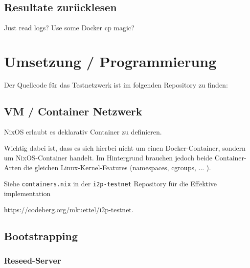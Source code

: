 \subsection{Resultate zurücklesen}

Just read logs? Use some Docker cp magic?

\section{Umsetzung / Programmierung}

Der Quellcode für das Testnetzwerk ist im folgenden Repository zu finden:

\subsection{VM / Container Netzwerk}

NixOS erlaubt es deklarativ Container zu definieren.

%

Wichtig dabei ist, dass es sich hierbei nicht um einen Docker-Container, sondern um NixOS-Container handelt.
Im Hintergrund brauchen jedoch beide Container-Arten die gleichen Linux-Kernel-Features (namespaces, cgroups, ... ).


Siehe \lstinline|containers.nix| in der \lstinline|i2p-testnet| Repository für die Effektive implementation


\url{https://codeberg.org/mkuettel/i2p-testnet}.

\subsection{Bootstrapping}

\subsubsection{Reseed-Server}

